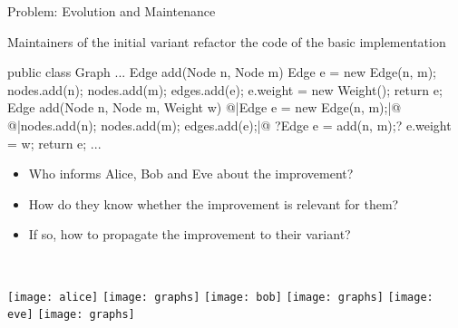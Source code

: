 \begin{frame}[fragile]{Problem: Evolution and Maintenance}
	\begin{mycolumns}[b,widths={43}]
		\begin{example}{}
			Maintainers of the initial variant refactor the code of the basic implementation
		\end{example}
\begin{codetight}{}
public class Graph {
	...
	Edge add(Node n, Node m) {
		Edge e = new Edge(n, m);
		nodes.add(n); nodes.add(m); edges.add(e);
		e.weight = new Weight();
		return e;
	}
	Edge add(Node n, Node m, Weight w) {
		@|Edge e = new Edge(n, m);|@
		@|nodes.add(n); nodes.add(m); edges.add(e);|@
		?Edge e = add(n, m);?
		e.weight = w;
		return e;
	}
	...
}
\end{codetight} %
	\mynextcolumn
		\begin{note}{}
			\begin{itemize}
				\item Who informs Alice, Bob and Eve about the improvement?
				\item How do they know whether the improvement is relevant for them?
				\item If so, how to propagate the improvement to their variant?
			\end{itemize}
		\end{note}

		~

		\texttt{[image: alice]}%
		\texttt{[image: graphs]}
		\hfill
		\texttt{[image: bob]}%
		\texttt{[image: graphs]}
		\hfill
		\texttt{[image: eve]}%
		\texttt{[image: graphs]}
	\end{mycolumns}
\end{frame}

